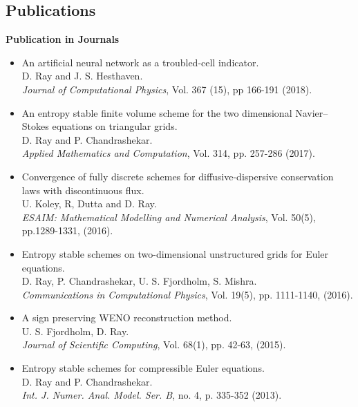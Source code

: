 \documentclass[margin]{res}
\begin{document}
\begin{resume}
 \section{Publications}

\textbf{Publication in Journals}                
            \begin{itemize}            
   
           \item An artificial neural network as a troubled-cell indicator.\\
            D. Ray and J. S. Hesthaven.\\
            {\it Journal of Computational Physics}, Vol. 367 (15), pp 166-191 (2018).

            \item An entropy stable finite volume scheme for the two dimensional Navier–Stokes equations on triangular grids.\\
            D. Ray and P. Chandrashekar.\\
              {\it Applied Mathematics and Computation}, Vol. 314, pp. 257-286 (2017).

             \item Convergence of fully discrete schemes for diffusive-dispersive conservation laws with discontinuous flux.\\
              U. Koley, R, Dutta and D. Ray. \\
              {\it ESAIM: Mathematical Modelling and Numerical Analysis}, Vol. 50(5), pp.1289-1331, (2016).
              
              \item Entropy stable schemes on two-dimensional unstructured grids for Euler equations.\\
              D. Ray, P. Chandrashekar, U. S. Fjordholm, S. Mishra. \\
              {\it Communications in Computational Physics}, Vol. 19(5), pp. 1111-1140, (2016).
            
              \item A sign preserving WENO reconstruction method.\\
              U. S. Fjordholm, D. Ray. \\
              {\it Journal of Scientific Computing}, Vol. 68(1), pp. 42-63, (2015).
             
              \item Entropy stable schemes for compressible Euler equations.\\
              D. Ray and P. Chandrashekar.\\
              {\it Int. J. Numer. Anal. Model. Ser. B}, no. 4, p. 335-352 (2013).
             \end{itemize}




\end{resume}
\end{document}

